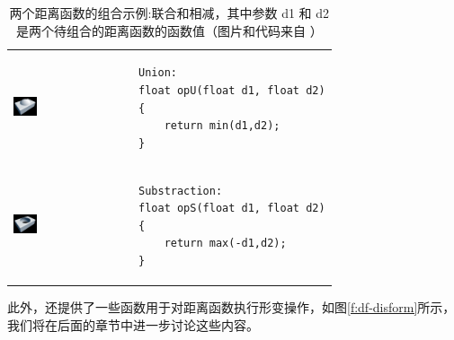 \begin{table}
\begin{tabular}{m{3cm}m{}} 
\includegraphics[width=0.21\textwidth]{graphics/df/union} &
	 \begin{lstlisting}
Union:
float opU(float d1, float d2)
{
    return min(d1,d2);
}
\end{lstlisting} \\
   \includegraphics[width=0.21\textwidth]{graphics/df/substraction} & 
    \begin{lstlisting}
Substraction:
float opS(float d1, float d2)
{
    return max(-d1,d2);
}
   \end{lstlisting}
\end{tabular}
\caption{两个距离函数的组合示例:联合和相减，其中参数 d1 和 d2是两个待组合的距离函数的函数值（图片和代码来自 \cite{w:distance-function}）}
\label{t:df-dist-function-2}
\end{table}

此外，\cite{w:distance-function}还提供了一些函数用于对距离函数执行形变操作，如图\ref{f:df-disform}所示，我们将在后面的章节中进一步讨论这些内容。

